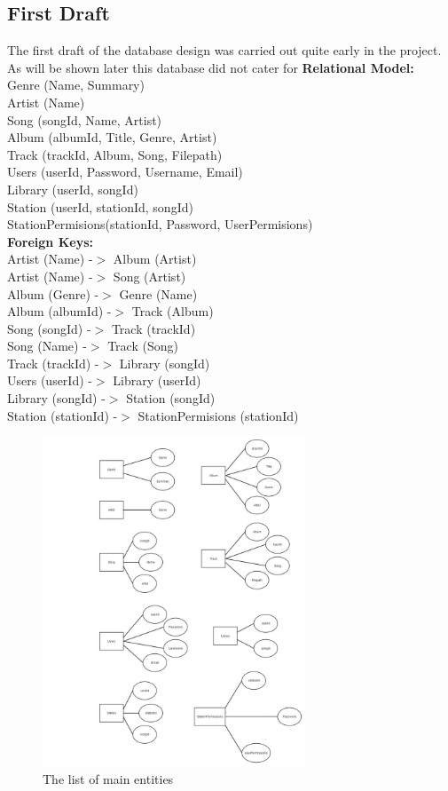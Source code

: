 \documentclass[a4paper, 12pt]{report}
\begin{document}
\subsection{First Draft}
The first draft of the database design was carried out quite early in the project. As will be shown later this database did not cater for 
\textbf{Relational Model:}\\
Genre (Name, Summary)\\
Artist (Name)\\
Song (songId, Name, Artist)\\
Album (albumId, Title, Genre, Artist)\\
Track (trackId, Album, Song, Filepath)\\
Users (userId, Password, Username, Email)\\
Library (userId, songId)\\
Station (userId, stationId, songId)\\
StationPermisions(stationId, Password, UserPermisions)\\
\textbf{Foreign Keys:}\\
Artist (Name) -$>$ Album (Artist)\\
Artist (Name) -$>$ Song (Artist)\\
Album (Genre) -$>$ Genre (Name)\\
Album (albumId) -$>$ Track (Album)\\
Song (songId) -$>$ Track (trackId)\\
Song (Name) -$>$ Track (Song)\\
Track (trackId) -$>$ Library (songId)\\
Users (userId) -$>$ Library (userId)\\
Library (songId) -$>$ Station (songId)\\
Station (stationId) -$>$ StationPermisions (stationId)\\
\begin{figure}[H]
  \centering
    \includegraphics[width=0.7\textwidth]{screenshots/database1.png}
    \caption{The list of main entities}
    \label{database1}
\end{figure}
\end{document}
